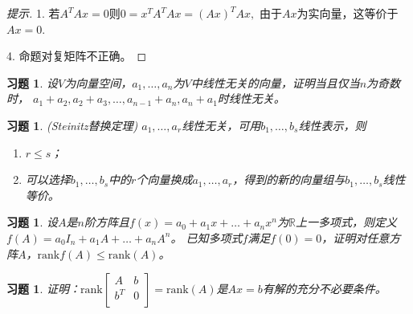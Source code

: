 \documentclass[UTF8]{ctexart}
\newcommand{\rank}{{\mathrm{rank}}}
\newtheorem{ex}[thm]{习题}
\begin{document}
\begin{proof}[提示]
1. 若$A^T A x = 0$则$0 = x^T A^T A x = (Ax)^T Ax,$ 由于$Ax$为实向量，这等价于$Ax=0.$

4. 命题对复矩阵不正确。
\end{proof}


\begin{ex}
		设$V$为向量空间，$a_1,\dots,a_n$为$V$中线性无关的向量，证明当且仅当$n$为奇数时，
	$a_1+a_2,a_2+a_3,\dots,a_{n-1}+a_n,a_n+a_1$时线性无关。
\end{ex}



\begin{ex}
	(Steinitz替换定理)
	$a_1,\dots,a_r$线性无关，可用$b_1,\dots,b_s$线性表示，则
	\begin{enumerate}
		\item $r\le s$；
		\item 可以选择$b_1,\dots,b_s$中的$r$个向量换成$a_1,\dots,a_r$，得到的新的向量组与$b_1,\dots,b_s$线性等价。
	\end{enumerate}
\end{ex}


\begin{ex}
	设$A$是$n$阶方阵且$f(x)=a_0+a_1x+\dots+a_nx^n$为$\mathbb{R}$上一多项式，则定义$f(A)=a_0I_n+a_1A+\dots+a_nA^n$。
	已知多项式$f$满足$f(0)=0$，证明对任意方阵$A$，$\rank f(A)\le \rank(A)$。
\end{ex}

\begin{ex}
	证明：$\rank \begin{bmatrix}
		A & b \\
		b^T & 0\\
	\end{bmatrix}=\rank(A)$是$Ax=b$有解的充分不必要条件。
\end{ex}
\end{document}
